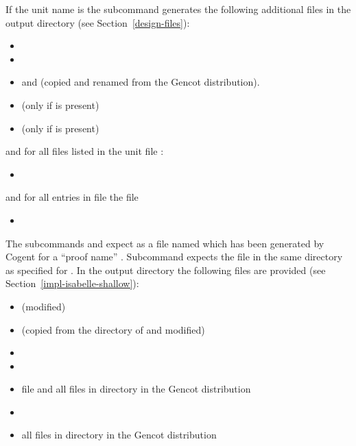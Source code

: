If the unit name is  the subcommand  generates the following additional files in the output 
directory (see Section~\ref{design-files}):
\begin{itemize}
\item {}
\item {}
\item {} and  (copied and renamed from the Gencot distribution).
\item {} (only if  is present)
\item {} (only if  is present)
\end{itemize}
and for all files  listed in the unit file :
\begin{itemize}
\item {}
\end{itemize}
and for all entries  in file  the file
\begin{itemize}
\item {}
\end{itemize}

The subcommands  and  expect as  a file named  
which has been generated
by Cogent for a ``proof name'' . Subcommand  expects the file  in the same directory 
as specified for . In the output directory the following files are provided (see Section~\ref{impl-isabelle-shallow}):
\begin{itemize}
\item {} (modified)
\item {} (copied from the directory of  and modified)
\item {}
\item {}
\item file  and all files  in directory  in the Gencot distribution
\item {}
\item all files  in directory  in the Gencot distribution
\end{itemize}


